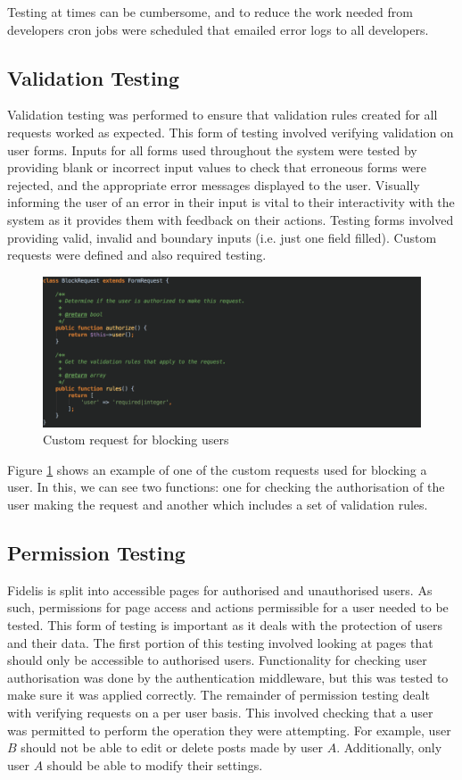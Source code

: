 Testing at times can be cumbersome, and to reduce the work needed from developers cron jobs were scheduled that emailed error logs to all developers. 

\subsection{Validation Testing}
Validation testing was performed to ensure that validation rules created for all requests worked as expected. This form of testing involved verifying validation on user forms. Inputs for all forms used throughout the system were tested by providing blank or incorrect input values to check that erroneous forms were rejected, and the appropriate error messages displayed to the user. Visually informing the user of an error in their input is vital to their interactivity with the system as it provides them with feedback on their actions. Testing forms involved providing valid, invalid and boundary inputs (i.e. just one field filled). Custom requests were defined and also required testing.

\begin{figure}[H]
\centering
\includegraphics[width=\linewidth]{Images/Testing/BlockRequest}
\caption{Custom request for blocking users}
\label{fig:BlockRequest}
\end{figure}

Figure \ref{fig:BlockRequest} shows an example of one of the custom requests used for blocking a user. In this, we can see two functions: one for checking the authorisation of the user making the request and another which includes a set of validation rules. 

\subsection{Permission Testing}
Fidelis is split into accessible pages for authorised and unauthorised users. As such, permissions for page access and actions permissible for a user needed to be tested. This form of testing is important as it deals with the protection of users and their data. The first portion of this testing involved looking at pages that should only be accessible to authorised users. Functionality for checking user authorisation was done by the authentication middleware, but this was tested to make sure it was applied correctly. The remainder of permission testing dealt with verifying requests on a per user basis. This involved checking that a user was permitted to perform the operation they were attempting. For example, user $B$ should not be able to edit or delete posts made by user $A$. Additionally, only user $A$ should be able to modify their settings.

